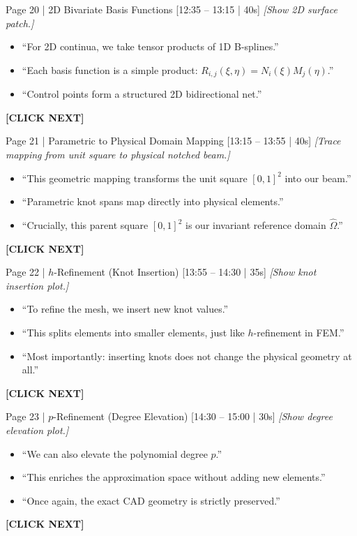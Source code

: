 \documentclass[9pt,a4paper]{article}
\begin{document}
\begin{slidebox}{Page 20 | 2D Bivariate Basis Functions \hfill [12:35 -- 13:15 | 40s]}
\textit{[Show 2D surface patch.]}
\begin{itemize}
  \item ``For 2D continua, we take tensor products of 1D B-splines.''
  \item ``Each basis function is a simple product: $R_{i,j}(\xi, \eta) = N_i(\xi) M_j(\eta)$.''
  \item ``Control points form a structured 2D bidirectional net.''
\end{itemize}
\textbf{\color{cnamred}[CLICK NEXT]}
\end{slidebox}

\begin{slidebox}{Page 21 | Parametric to Physical Domain Mapping \hfill [13:15 -- 13:55 | 40s]}
\textit{[Trace mapping from unit square to physical notched beam.]}
\begin{itemize}
  \item ``This geometric mapping transforms the unit square $[0,1]^2$ into our beam.''
  \item ``Parametric knot spans map directly into physical elements.''
  \item ``Crucially, this parent square $[0,1]^2$ is our invariant reference domain $\hat{\Omega}$.''
\end{itemize}
\textbf{\color{cnamred}[CLICK NEXT]}
\end{slidebox}

\begin{slidebox}{Page 22 | $h$-Refinement (Knot Insertion) \hfill [13:55 -- 14:30 | 35s]}
\textit{[Show knot insertion plot.]}
\begin{itemize}
  \item ``To refine the mesh, we insert new knot values.''
  \item ``This splits elements into smaller elements, just like $h$-refinement in FEM.''
  \item ``Most importantly: inserting knots does not change the physical geometry at all.''
\end{itemize}
\textbf{\color{cnamred}[CLICK NEXT]}
\end{slidebox}

\begin{slidebox}{Page 23 | $p$-Refinement (Degree Elevation) \hfill [14:30 -- 15:00 | 30s]}
\textit{[Show degree elevation plot.]}
\begin{itemize}
  \item ``We can also elevate the polynomial degree $p$.''
  \item ``This enriches the approximation space without adding new elements.''
  \item ``Once again, the exact CAD geometry is strictly preserved.''
\end{itemize}
\textbf{\color{cnamred}[CLICK NEXT]}
\end{slidebox}
\end{document}
